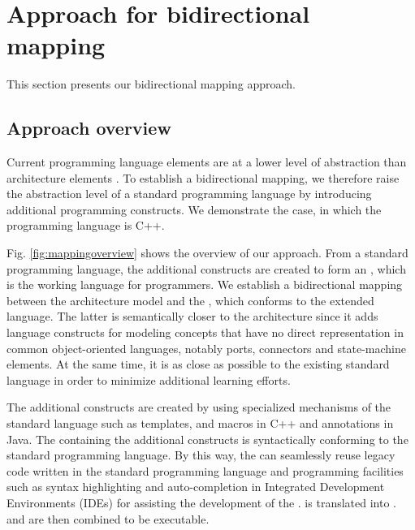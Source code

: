 \section{Approach for bidirectional mapping}
\label{sec:approach}
This section presents our bidirectional mapping approach.%


\subsection{Approach overview}
Current programming language elements are at a lower level of abstraction than architecture elements \cite{DeSilva2012}.
To establish a bidirectional mapping, we therefore raise the abstraction level of a standard programming language by introducing additional programming constructs.
We demonstrate the case, in which the programming language is C++.

Fig. \ref{fig:mappingoverview} shows the overview of our approach.
From a standard programming language, the additional constructs are created to form an , which is the working language for programmers.
We establish a bidirectional mapping between the architecture model and the , which conforms to the extended language.
The latter is semantically closer to the architecture since it adds language constructs for modeling concepts that have no direct representation in common object-oriented languages, notably ports, connectors and state-machine elements. 
At the same time, it is as close as possible to the existing standard language in order to minimize additional learning efforts.

The additional constructs are created by using specialized mechanisms of the standard language such as templates, and macros in C++ and annotations in Java.
The  containing the additional constructs is syntactically conforming to the standard programming language. 
By this way, the  can seamlessly reuse legacy code written in the standard programming language and programming facilities such as syntax highlighting and auto-completion in Integrated Development Environments (IDEs) for assisting the development of the . 
 is translated into .  and  are then combined to be executable.

